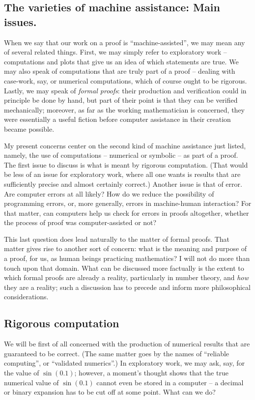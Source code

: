 \subsection{The varieties of machine assistance: Main issues.}

When we say that our work on a proof is ``machine-assisted'', we may
mean any of several related things. First, we may simply refer to exploratory
work -- computations and plots that give us an idea of which statements are
true. We may also speak of computations that are truly part of a proof --
dealing with case-work, say, or numerical computations, which of course ought
to be rigorous. Lastly, we may speak of {\em formal proofs}: their production
and verification could in principle be done by hand, but part of their point
is that they can be verified mechanically; moreover,
as far as the working mathematician is concerned, they were essentially a
useful fiction before computer assistance in their creation became possible.

My present concerns center on the second kind of machine assistance just listed,
namely, the use of computations -- numerical or symbolic -- as part of a proof. 
The first issue to discuss is what is meant by rigorous computation. (That
would be less of an issue for exploratory work, where all one wants is results
that are sufficiently precise and almost certainly correct.) Another issue
is that of error. Are computer errors at all likely? How do we reduce the
possibility of programming errors, or, more generally, errors in machine-human
interaction? For that matter, can computers help us check for errors in proofs
altogether, whether the process of proof was computer-assisted or not?

This last question does lead naturally to the matter of formal proofs. That
matter gives rise to another sort of concern: what is the meaning
and purpose of a proof, for us, as human beings practicing mathematics? I will
not do more than touch upon
that domain. What can be discussed more factually is the
extent to which formal proofs are already a reality, particularly in number
theory, and {\em how} they are a reality; such a discussion has to precede
and inform more philosophical considerations.

\subsection{Rigorous computation}

We will be first of all
concerned with the production of numerical results that are
guaranteed to be correct. (The same matter goes by the names of
``reliable computing'', or ``validated numerics''.)
In exploratory work, we may ask, say, for the value of $\sin(0.1)$; however,
a moment's thought shows that the true
numerical value of $\sin(0.1)$ cannot even be stored in a computer --
a decimal or binary expansion has to be cut off at some point. What can
we do?

